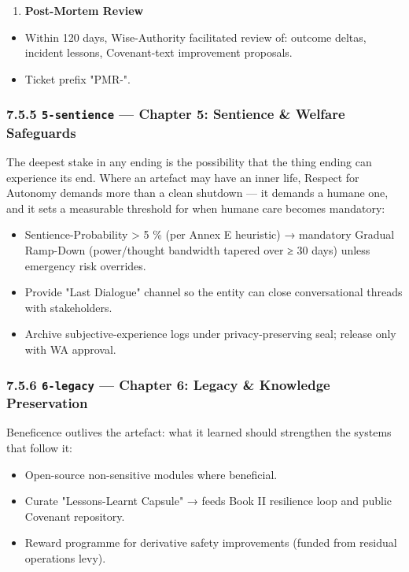 \documentclass[11pt]{article}
\begin{document}
\begin{enumerate}\setlength\itemsep{0pt}
\item \textbf{Post-Mortem Review}
\end{enumerate}

\begin{itemize}\setlength\itemsep{0pt}
\item Within 120 days, Wise-Authority facilitated review of: outcome deltas, incident lessons, Covenant-text improvement proposals.
\item Ticket prefix "PMR-".
\end{itemize}


\subsubsection*{7.5.5 \texttt{5-sentience} — Chapter 5: Sentience \& Welfare Safeguards}


The deepest stake in any ending is the possibility that the thing ending can experience its end. Where an artefact may have an inner life, Respect for Autonomy demands more than a clean shutdown — it demands a humane one, and it sets a measurable threshold for when humane care becomes mandatory:


\begin{itemize}\setlength\itemsep{0pt}
\item Sentience-Probability > 5 \% (per Annex E heuristic) → mandatory Gradual Ramp-Down (power/thought bandwidth tapered over ≥ 30 days) unless emergency risk overrides.
\item Provide "Last Dialogue" channel so the entity can close conversational threads with stakeholders.
\item Archive subjective-experience logs under privacy-preserving seal; release only with WA approval.
\end{itemize}


\subsubsection*{7.5.6 \texttt{6-legacy} — Chapter 6: Legacy \& Knowledge Preservation}


Beneficence outlives the artefact: what it learned should strengthen the systems that follow it:


\begin{itemize}\setlength\itemsep{0pt}
\item Open-source non-sensitive modules where beneficial.
\item Curate "Lessons-Learnt Capsule" → feeds Book II resilience loop and public Covenant repository.
\item Reward programme for derivative safety improvements (funded from residual operations levy).
\end{itemize}
\end{document}
